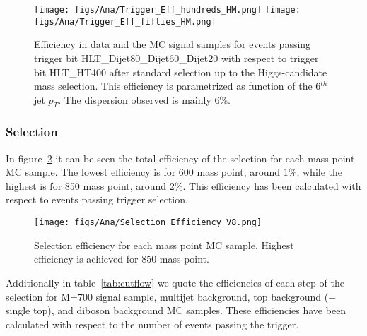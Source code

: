 \begin{figure}[!Hhtbp]
  \begin{center}
    \texttt{[image: figs/Ana/Trigger\_Eff\_hundreds\_HM.png]}
    \texttt{[image: figs/Ana/Trigger\_Eff\_fifties\_HM.png]}
    \caption{Efficiency in data and the MC signal samples for events passing trigger bit HLT\_Dijet80\_Dijet60\_Dijet20 with respect to trigger bit HLT\_HT400 after standard selection up to the Higgs-candidate mass selection. This efficiency is parametrized as function of the 6$^{th}$ jet $p_{T}$. The dispersion observed is mainly 6\%.}
    \label{fig:TrigEffPostMH}
  \end{center}
\end{figure}

\subsubsection{Selection}
\label{sec:seleff}

In figure~\ref{fig:MPEff} it can be seen the total efficiency of the selection for each mass point MC sample. The lowest efficiency is for 600 \GeVcc mass point, around 1\%, while the highest is for 850 \GeVcc mass point, around 2\%. This efficiency has been calculated with respect to events passing trigger selection.  

\begin{figure}[!Hhtbp]
  \begin{center}
    \texttt{[image: figs/Ana/Selection\_Efficiency\_V8.png]}
    \caption{Selection efficiency for each mass point MC sample. Highest efficiency is achieved for 850 \GeVcc mass point.}
    \label{fig:MPEff}
  \end{center}
\end{figure}

Additionally in table~\ref{tab:cutflow} we quote the efficiencies of each step of the selection for M=700 \GeVcc signal sample, multijet background, top background (\ttbar + single top), and diboson background MC samples. These efficiencies have been calculated with respect to the number of events passing the trigger.


